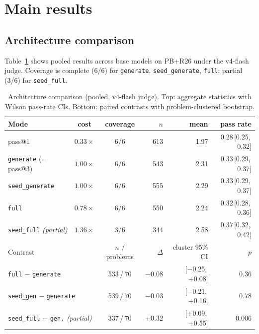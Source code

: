 \documentclass{article}
\begin{document}
\section{Main results}
\label{sec:results}

\subsection{Architecture comparison}
\label{sec:archcomp}

Table~\ref{tab:arch} shows pooled results across base models on PB+R26 under the
v4-flash judge.
Coverage is complete (6/6) for \texttt{generate}, \texttt{seed\_generate},
\texttt{full}; partial (3/6) for \texttt{seed\_full}.

\begin{table}[t]
  \caption{Architecture comparison (pooled, v4-flash judge). Top: aggregate
    statistics with Wilson pass-rate CIs. Bottom: paired contrasts with
    problem-clustered bootstrap.}
  \label{tab:arch}
  \centering
  \small
  \begin{tabular}{lccrrr}
    \toprule
    Mode & cost & coverage & $n$ & mean & pass rate \\
    \midrule
    pass@1 & $0.33\times$ & 6/6 & 613 & 1.97 & 0.28\,[0.25,\,0.32] \\
    \texttt{generate} (= pass@3) & $1.00\times$ & 6/6 & 543 & 2.31 & 0.33\,[0.29,\,0.37] \\
    \texttt{seed\_generate} & $1.00\times$ & 6/6 & 555 & 2.29 & 0.33\,[0.29,\,0.37] \\
    \texttt{full} & $0.78\times$ & 6/6 & 550 & 2.24 & 0.32\,[0.28,\,0.36] \\
    \texttt{seed\_full} \emph{(partial)} & $1.36\times$ & 3/6 & 344 & 2.58 & 0.37\,[0.32,\,0.42] \\
    \midrule
    \multicolumn{2}{l}{Contrast} & $n$ / problems & $\Delta$ & cluster 95\% CI & $p$ \\
    \midrule
    \multicolumn{2}{l}{\texttt{full} $-$ \texttt{generate}} & 533\,/\,70 & $-$0.08 & [$-$0.25,\,+0.08] & 0.36 \\
    \multicolumn{2}{l}{\texttt{seed\_gen} $-$ \texttt{generate}} & 539\,/\,70 & $-$0.03 & [$-$0.21,\,+0.16] & 0.78 \\
    \multicolumn{2}{l}{\texttt{seed\_full} $-$ \texttt{gen.} \emph{(partial)}} & 337\,/\,70 & +0.32 & [+0.09,\,+0.55] & 0.006 \\
    \bottomrule
  \end{tabular}
\end{table}
\end{document}

